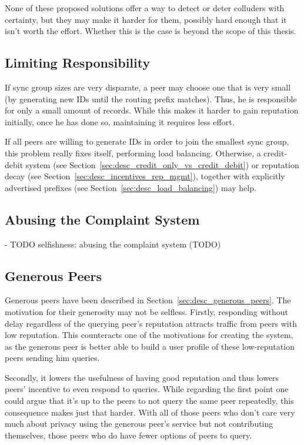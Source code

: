 None of these proposed solutions offer a way to detect or deter colluders with
certainty, but they may make it harder for them, possibly hard enough that it
isn't worth the effort. Whether this is the case is beyond the scope of this
thesis.

\subsection{Limiting Responsibility}
If sync group sizes are very disparate, a peer may choose one that is very small
(by generating new IDs until the routing prefix matches). Thus, he is
responsible for only a small amount of records. While this makes it harder to
gain reputation initially, once he has done so, maintaining it requires less
effort.

If all peers are willing to generate IDs in order to join the smallest sync
group, this problem really fixes itself, performing load balancing. Otherwise, a
credit-debit system (see Section~\ref{sec:desc_credit_only_vs_credit_debit}) or
reputation decay (see Section~\ref{sec:desc_incentives_rep_mgmt}), together with
explicitly advertised prefixes (see Section~\ref{sec:desc_load_balancing}) may
help.

\subsection{Abusing the Complaint System}
- TODO selfishness: abusing the complaint system (TODO)

\subsection{Generous Peers}
\label{sec:desc_attacks_generous}
Generous peers have been described in Section~\ref{sec:desc_generous_peers}.
The motivation for their generosity may not be selfless. Firstly, responding
without delay regardless of the querying peer's reputation attracts traffic from
peers with low reputation. This counteracts one of the motivations for creating
the system, as the generous peer is better able to build a user profile of these
low-reputation peers sending him queries.

Secondly, it lowers the usefulness of having good reputation and thus lowers
peers' incentive to even respond to queries. While regarding the first point one
could argue that it's up to the peers to not query the same peer repeatedly,
this consequence makes just that harder. With all of those peers who don't care
very much about privacy using the generous peer's service but not contributing
themselves, those peers who do have fewer options of peers to query.

